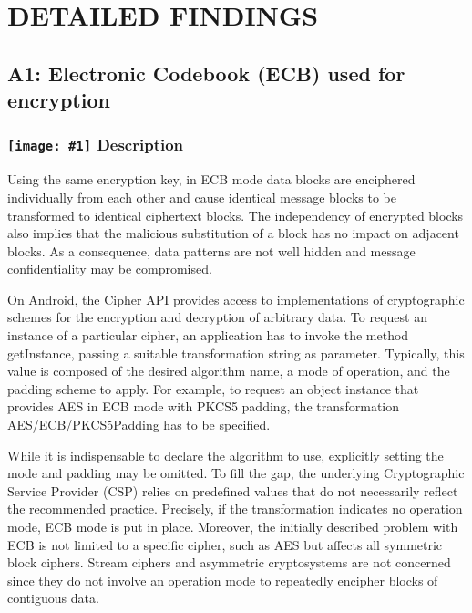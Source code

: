 \documentclass[12p]{article}
\newcommand{\icon}[1]{\texttt{[image: \#1]}}
\begin{document}
\section{DETAILED FINDINGS}
\subsection{A1: Electronic Codebook (ECB) used for encryption}
\subsubsection*{\protect\icon{/home/miki/Documents/GITHUB/AndroidPermissions/python/vulns/report_icons/basic_sheet.png} Description}

            Using the same encryption key, in ECB mode data blocks are enciphered individually 
            from each other and cause identical message blocks to be transformed to identical ciphertext 
            blocks. The independency of encrypted blocks also implies that the malicious substitution of a 
            block has no impact on adjacent blocks. As a consequence, data patterns are not well hidden and 
            message confidentiality may be compromised.
            
            On Android, the Cipher API provides access to implementations of cryptographic schemes
            for the encryption and decryption of arbitrary data. To request an instance of a particular cipher,
            an application has to invoke the method getInstance, passing a suitable transformation string as
            parameter. Typically, this value is composed of the desired algorithm name, a mode of operation,
            and the padding scheme to apply. For example, to request an object instance that provides AES in
            ECB mode with PKCS5 padding, the transformation AES/ECB/PKCS5Padding has to be specified.
            
            While it is indispensable to declare the algorithm to use, explicitly setting the mode and
            padding may be omitted. To fill the gap, the underlying Cryptographic Service Provider (CSP)
            relies on predefined values that do not necessarily reflect the recommended practice. Precisely, if
            the transformation indicates no operation mode, ECB mode is put in place. Moreover, the initially
            described problem with ECB is not limited to a specific cipher, such as AES but affects all symmetric
            block ciphers. Stream ciphers and asymmetric cryptosystems are not concerned since they
            do not involve an operation mode to repeatedly encipher blocks of contiguous data.
        
\end{document}
